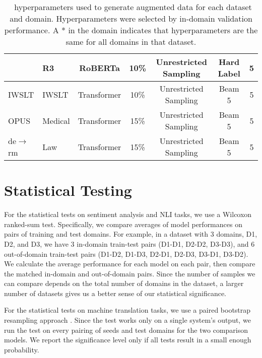 \begin{table*}[t]
\begin{tabular}{llccccc}
& R3 & RoBERTa & 10\% & Unrestricted Sampling & Hard Label & 5\\
\midrule
IWSLT & IWSLT & Transformer & 10\% & Unrestricted Sampling & Beam 5 & 5\\
\midrule
OPUS & Medical & Transformer & 15\% & Unrestricted Sampling & Beam 5 & 5\\
\midrule
de$\to$rm & Law & Transformer & 15\% & Unrestricted Sampling & Beam 5 & 5\\
\bottomrule
\end{tabular}
\caption{\ssmba\ hyperparameters used to generate augmented data for each dataset and domain. Hyperparameters were selected by in-domain validation performance. A * in the domain indicates that hyperparameters are the same for all domains in that dataset.}
\label{tab:ssmba_hyperparams}
\end{table*}

\section{Statistical Testing}
\label{app:stats}
For the statistical tests on sentiment analysis and NLI tasks, we use a Wilcoxon ranked-sum test. 
Specifically, we compare averages of model performances on pairs of training and test domains.
For example, in a dataset with 3 domains, D1, D2, and D3, we have 3 in-domain train-test pairs (D1-D1, D2-D2, D3-D3), and 6 out-of-domain train-test pairs (D1-D2, D1-D3, D2-D1, D2-D3, D3-D1, D3-D2).
We calculate the average performance for each model on each pair, then compare the matched in-domain and out-of-domain pairs. 
Since the number of samples we can compare depends on the total number of domains in the dataset, a larger number of datasets gives us a better sense of our statistical significance.

For the statistical tests on machine translation tasks, we use a paired bootstrap resampling approach \citep{koehn-2004-statistical}. 
Since the test works only on a single system's output, we run the test on every pairing of seeds and test domains for the two comparison models.
We report the significance level only if all tests result in a small enough probability.